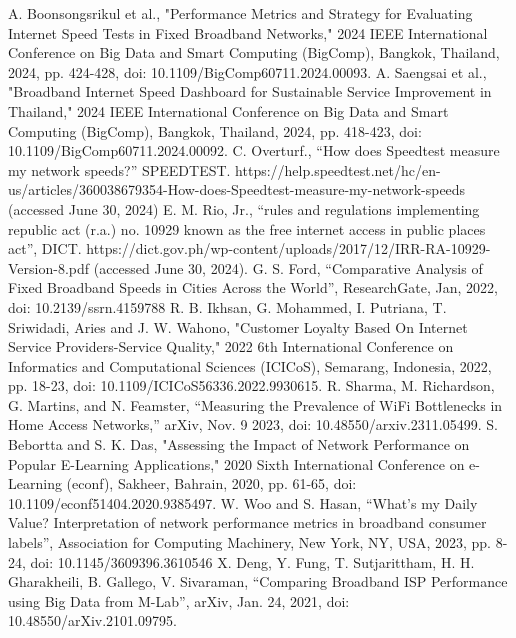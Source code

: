 \documentclass[conference]{IEEEtran}
\begin{document}
\begin{thebibliography}{00}
 A. Boonsongsrikul et al., "Performance Metrics and Strategy for Evaluating Internet Speed Tests in Fixed Broadband Networks," 2024 IEEE International Conference on Big Data and Smart Computing (BigComp), Bangkok, Thailand, 2024, pp. 424-428, doi: 10.1109/BigComp60711.2024.00093.
 A. Saengsai et al., "Broadband Internet Speed Dashboard for Sustainable Service Improvement in Thailand," 2024 IEEE International Conference on Big Data and Smart Computing (BigComp), Bangkok, Thailand, 2024, pp. 418-423, doi: 10.1109/BigComp60711.2024.00092. 
 C. Overturf., “How does Speedtest measure my network speeds?” SPEEDTEST. https://help.speedtest.net/hc/en-us/articles/360038679354-How-does-Speedtest-measure-my-network-speeds (accessed June 30, 2024)
 E. M. Rio, Jr.,  “rules and regulations implementing republic act (r.a.) no. 10929 known as the free internet access in public places act”, DICT. https://dict.gov.ph/wp-content/uploads/2017/12/IRR-RA-10929-Version-8.pdf (accessed June 30, 2024).
 G. S. Ford, “Comparative Analysis of Fixed Broadband Speeds in Cities Across the World”, ResearchGate, Jan, 2022, doi: 10.2139/ssrn.4159788
 R. B. Ikhsan, G. Mohammed, I. Putriana, T. Sriwidadi, Aries and J. W. Wahono, "Customer Loyalty Based On Internet Service Providers-Service Quality," 2022 6th International Conference on Informatics and Computational Sciences (ICICoS), Semarang, Indonesia, 2022, pp. 18-23, doi: 10.1109/ICICoS56336.2022.9930615.
 R. Sharma, M. Richardson, G. Martins, and N. Feamster, “Measuring the Prevalence of WiFi Bottlenecks in Home Access Networks,” arXiv, Nov. 9 2023, doi: 10.48550/arxiv.2311.05499.
 S. Bebortta and S. K. Das, "Assessing the Impact of Network Performance on Popular E-Learning Applications," 2020 Sixth International Conference on e-Learning (econf), Sakheer, Bahrain, 2020, pp. 61-65, doi: 10.1109/econf51404.2020.9385497.
 W. Woo and S. Hasan, “What's my Daily Value? Interpretation of network performance metrics in broadband consumer labels”, Association for Computing Machinery, New York, NY, USA, 2023, pp. 8-24, doi: 10.1145/3609396.3610546
 X. Deng, Y. Fung, T. Sutjarittham, H. H. Gharakheili, B. Gallego, V. Sivaraman, “Comparing Broadband ISP Performance using Big Data from M-Lab”, arXiv, Jan. 24, 2021, doi: 10.48550/arXiv.2101.09795.
\end{thebibliography}
\end{document}

